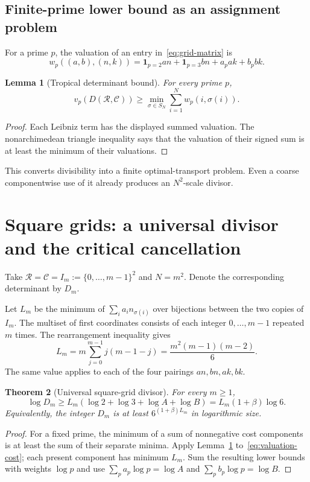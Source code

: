 \documentclass[11pt]{article}
\newtheorem{theorem}{Theorem}[section]
\newtheorem{lemma}[theorem]{Lemma}
\theoremstyle{definition}
\begin{document}
\subsection{Finite-prime lower bound as an assignment problem}

For a prime $p$, the valuation of an entry in~\eqref{eq:grid-matrix} is
\begin{equation}\label{eq:valuation-cost}
 w_p((a,b),(n,k))
 =\mathbf1_{p=2}an+\mathbf1_{p=3}bn+a_p ak+b_p bk.
\end{equation}

\begin{lemma}[Tropical determinant bound]\label{lem:tropical}
For every prime $p$,
\[
 v_p(D(\mathcal R,\mathcal C))
 \ge \min_{\sigma\in S_N}\sum_{i=1}^N w_p(i,\sigma(i)).
\]
\end{lemma}
\begin{proof}
Each Leibniz term has the displayed summed valuation.  The nonarchimedean
triangle inequality says that the valuation of their signed sum is at least
the minimum of their valuations.
\end{proof}

This converts divisibility into a finite optimal-transport problem.  Even a
coarse componentwise use of it already produces an $N^2$-scale divisor.

\section{Square grids: a universal divisor and the critical cancellation}

Take $\mathcal R=\mathcal C=I_m:=\{0,\ldots,m-1\}^2$ and $N=m^2$.  Denote the
corresponding determinant by $D_m$.

Let $L_m$ be the minimum of $\sum_i a_i n_{\sigma(i)}$ over bijections between
the two copies of $I_m$.  The multiset of first coordinates consists of each
integer $0,\ldots,m-1$ repeated $m$ times.  The rearrangement inequality gives
\begin{equation}\label{eq:Lm}
 L_m=m\sum_{j=0}^{m-1}j(m-1-j)
 =\frac{m^2(m-1)(m-2)}6.
\end{equation}
The same value applies to each of the four pairings $an,bn,ak,bk$.

\begin{theorem}[Universal square-grid divisor]\label{thm:square-divisor}
For every $m\ge1$,
\begin{equation}\label{eq:square-lower}
 \log D_m\ge L_m(\log2+\log3+\log A+\log B)
 =L_m(1+\beta)\log6.
\end{equation}
Equivalently, the integer $D_m$ is at least
$6^{(1+\beta)L_m}$ in logarithmic size.
\end{theorem}
\begin{proof}
For a fixed prime, the minimum of a sum of nonnegative cost components is at
least the sum of their separate minima.  Apply
Lemma~\ref{lem:tropical} to~\eqref{eq:valuation-cost}; each present component
has minimum $L_m$.  Sum the resulting lower bounds with weights $\log p$ and
use
$\sum_pa_p\log p=\log A$ and
$\sum_pb_p\log p=\log B$.
\end{proof}
\end{document}
